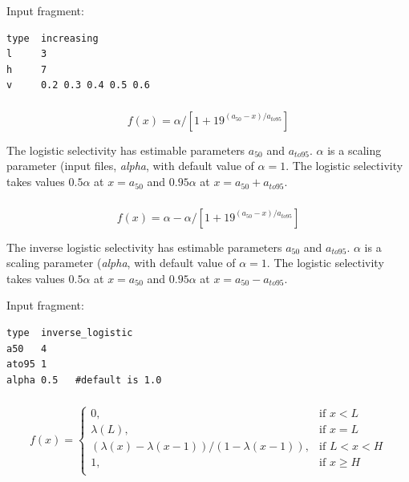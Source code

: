 Input fragment: {\small{\begin{verbatim}
type  increasing
l     3
h     7
v     0.2 0.3 0.4 0.5 0.6

\end{verbatim}}}
\subsubsection[Logistic]{}\label{sec:Selectivity-Logistic}

\begin{equation}
  f(x) = \alpha / [1+19^{(a_{50}-x)/a_{to95}}]
\end{equation}

The logistic selectivity has estimable parameters $a_{50}$ and $a_{to95}$. $\alpha$ is a scaling parameter (input files, \textit{alpha}, with default value of $\alpha = 1$. The logistic selectivity takes values $0.5 \alpha$ at $x=a_{50}$ and $0.95 \alpha$ at $x=a_{50}+a_{to95}$.

\subsubsection[Inverse logistic]{}\label{sec:Selectivity-InverseLogistic} 

\begin{equation}
  f(x) = \alpha - \alpha / [1+19^{(a_{50}-x)/a_{to95}}]
\end{equation}

The inverse logistic selectivity has estimable parameters $a_{50}$ and $a_{to95}$. $\alpha$ is a scaling parameter (\textit{alpha}, with default value of $\alpha = 1$. The logistic selectivity takes values $0.5 \alpha$ at $x=a_{50}$ and $0.95 \alpha$ at $x=a_{50}-a_{to95}$.

Input fragment: {\small{\begin{verbatim}
type  inverse_logistic
a50   4
ato95 1
alpha 0.5   #default is 1.0
\end{verbatim}}}

\subsubsection[Logistic producing]{}\label{sec:Selectivity-LogisticProducing}

\begin{equation}
f(x)=\begin{cases}
	  0, & \text{if $x < L$} \\
	  \lambda(L), & \text{if $x=L$} \\
	  \left( \lambda(x)-\lambda(x-1) \right) / \left( 1-\lambda(x-1) \right), & \text{if $L < x < H$} \\
	  1, & \text{if $x \ge H$} \\
  \end{cases}
\end{equation}

